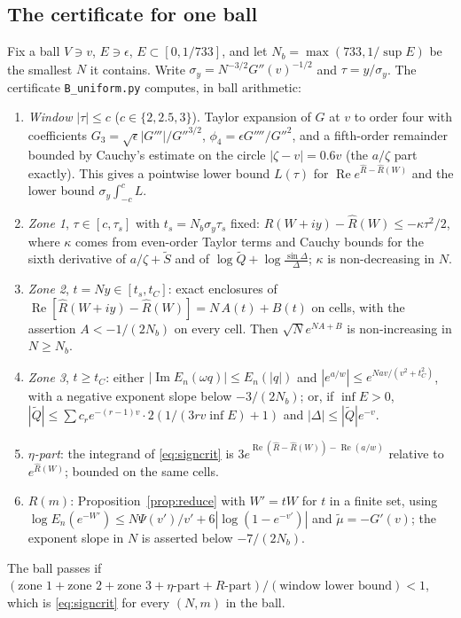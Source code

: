 \documentclass[11pt,reqno]{amsart}
\theoremstyle{plain}
\theoremstyle{definition}
\newcommand{\Rh}{\widehat{R}}
\renewcommand{\Re}{\operatorname{Re}}
\renewcommand{\Im}{\operatorname{Im}}
\begin{document}
\subsection{The certificate for one ball}
Fix a ball $V\ni v$, $E\ni\epsilon$, $E\subset[0,1/733]$, and let $N_b=\max(733,1/\sup E)$ be the smallest $N$ it contains. Write
$\sigma_y=N^{-3/2}G''(v)^{-1/2}$ and $\tau=y/\sigma_y$. The certificate \texttt{B\_uniform.py} computes, in ball arithmetic:
\begin{enumerate}
\item \emph{Window} $|\tau|\le c$ ($c\in\{2,2.5,3\}$). Taylor expansion of $G$ at $v$ to order four with coefficients
$G_3=\sqrt\epsilon|G'''|/G''^{3/2}$, $\phi_4=\epsilon G''''/G''^2$, and a fifth-order remainder bounded by Cauchy's estimate on the
circle $|\zeta-v|=0.6v$ (the $a/\zeta$ part exactly). This gives a pointwise lower bound $L(\tau)$ for $\Re e^{\Rh-\Rh(W)}$ and the
lower bound $\sigma_y\int_{-c}^cL$.
\item \emph{Zone 1}, $\tau\in[c,\tau_s]$ with $t_s=N_b\sigma_y\tau_s$ fixed: $\Rh(W+iy)-\Rh(W)\le-\kappa\tau^2/2$, where $\kappa$ comes from
even-order Taylor terms and Cauchy bounds for the sixth derivative of $a/\zeta+\widetilde S$ and of $\log\widetilde Q+\log\frac{\sin\Delta}{\Delta}$;
$\kappa$ is non-decreasing in $N$.
\item \emph{Zone 2}, $t=Ny\in[t_s,t_C]$: exact enclosures of $\Re[\Rh(W+iy)-\Rh(W)]=N\,A(t)+B(t)$ on cells, with the assertion
$A<-1/(2N_b)$ on every cell. Then $\sqrt N e^{NA+B}$ is non-increasing in $N\ge N_b$.
\item \emph{Zone 3}, $t\ge t_C$: either $|\Im E_n(\omega q)|\le E_n(|q|)$ and $|e^{a/w}|\le e^{Nav/(v^2+t_C^2)}$, with a negative exponent
slope below $-3/(2N_b)$; or, if $\inf E>0$, $|\widetilde Q|\le\sum c_re^{-(r-1)v}\cdot2(1/(3rv\inf E)+1)$ and $|\Delta|\le|\widetilde Q|e^{-v}$.
\item \emph{$\eta$-part}: the integrand of \eqref{eq:signcrit} is $3e^{\Re(\Rh-\Rh(W))-\Re(a/w)}$ relative to $e^{\Rh(W)}$; bounded on the same cells.
\item \emph{$R(m)$}: Proposition~\ref{prop:reduce} with $W'=tW$ for $t$ in a finite set, using $\log E_n(e^{-W'})\le N\Psi(v')/v'+6|\log(1-e^{-v'})|$
and $\tilde\mu=-G'(v)$; the exponent slope in $N$ is asserted below $-7/(2N_b)$.
\end{enumerate}
The ball passes if $(\text{zone 1}+\text{zone 2}+\text{zone 3}+\eta\text{-part}+R\text{-part})/(\text{window lower bound})<1$, which is
\eqref{eq:signcrit} for every $(N,m)$ in the ball.
\end{document}
